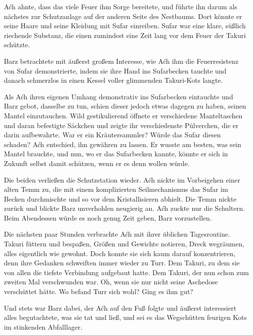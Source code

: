 Aćh ahnte, dass das viele Feuer ihm Sorge bereitete, und führte ihn darum als nächstes zur Schutzanlage auf der anderen Seite des Nestbaums. Dort könnte er seine Haare und seine Kleidung mit Sufar einreiben. Sufar war eine klare, süßlich riechende Substanz, die einen zumindest eine Zeit lang vor dem Feuer der Takuri schützte.

Barz betrachtete mit äußerst großem Interesse, wie Aćh ihm die Feuerresistenz von Sufar demonstrierte, indem sie ihre Hand ins Sufarbecken tauchte und danach schmerzlos in einen Kessel voller glimmenden Takuri-Kots langte.

Als Aćh ihren eigenen Umhang demonstrativ ins Sufarbecken eintauchte und Barz gebot, dasselbe zu tun, schien dieser jedoch etwas dagegen zu haben, seinen Mantel einzutauchen. Wild gestikulierend öffnete er verschiedene Manteltaschen und daran befestigte Säckchen und zeigte ihr verschiedenste Pülverchen, die er darin aufbewahrte. War er ein Kräutersammler? Würde das Sufar diesen schaden? Aćh entschied, ihn gewähren zu lassen. Er wusste am besten, was sein Mantel brauchte, und nun, wo er das Sufarbecken kannte, könnte er sich in Zukunft selbst damit schützen, wenn er es denn wollen würde.

Die beiden verließen die Schutzstation wieder. Aćh nickte im Vorbeigehen einer alten Temm zu, die mit einem komplizierten Seilmechanismus das Sufar im Becken durchmischte und so vor dem Kristallisieren abhielt. Die Temm nickte zurück und blickte Barz unverhohlen neugierig an. Aćh zuckte nur die Schultern. Beim Abendessen würde es noch genug Zeit geben, Barz vorzustellen.

Die nächsten paar Stunden verbrachte Aćh mit ihrer üblichen Tagesroutine. Takuri füttern und bespaßen, Größen und Gewichte notieren, Dreck wegräumen, alles eigentlich wie gewohnt. Doch konnte sie sich kaum darauf konzentrieren, denn ihre Gedanken schweiften immer wieder zu Turr. Dem Takuri, zu dem sie von allen die tiefste Verbindung aufgebaut hatte. Dem Takuri, der nun schon zum zweiten Mal verschwunden war. Oh, wenn sie nur nicht seine Aschedose verschüttet hätte. Wo befand Turr sich wohl? Ging es ihm gut?

Und stets war Barz dabei, der Aćh auf den Fuß folgte und äußerst interessiert alles begutachtete, was sie tat und ließ, und sei es das Wegschütten feurigen Kots im stinkenden Abfalllager.



\trennzeichen




